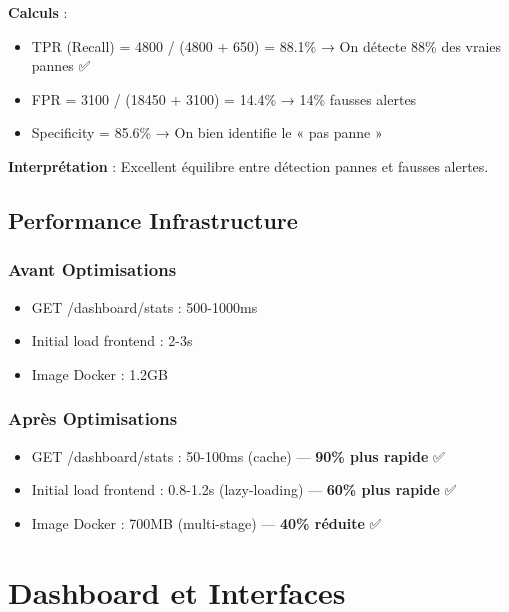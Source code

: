 \documentclass[12pt,a4paper,french]{article}
\begin{document}
\textbf{Calculs} :
\begin{itemize}
    \item TPR (Recall) = 4800 / (4800 + 650) = 88.1\% → On détecte 88\% des vraies pannes ✅
    \item FPR = 3100 / (18450 + 3100) = 14.4\% → 14\% fausses alertes
    \item Specificity = 85.6\% → On bien identifie le « pas panne »
\end{itemize}

\textbf{Interprétation} : Excellent équilibre entre détection pannes et fausses alertes.

\subsection{Performance Infrastructure}

\subsubsection{Avant Optimisations}

\begin{itemize}
    \item GET /dashboard/stats : 500-1000ms
    \item Initial load frontend : 2-3s
    \item Image Docker : 1.2GB
\end{itemize}

\subsubsection{Après Optimisations}

\begin{itemize}
    \item GET /dashboard/stats : 50-100ms (cache) — \textbf{90\% plus rapide} ✅
    \item Initial load frontend : 0.8-1.2s (lazy-loading) — \textbf{60\% plus rapide} ✅
    \item Image Docker : 700MB (multi-stage) — \textbf{40\% réduite} ✅
\end{itemize}

\section{Dashboard et Interfaces}
\end{document}
